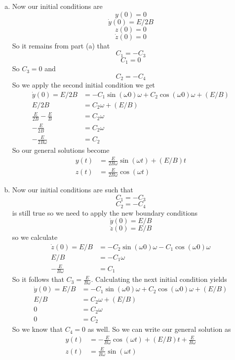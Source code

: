 \documentclass[11pt]{article}
\numberwithin{equation}{section}
\begin{document}
\begin{enumerate}[(a)]
\item
Now our initial conditions are
$$y(0) = 0$$
$$\dot{y}(0) = E/2B$$
$$z(0) = 0$$
$$\dot{z}(0) = 0$$
So it remains from part (a) that
$$C_1 = -C_3$$
$$C_1 = 0$$
So $C_3=0$ 
and 
$$C_2 = -C_4$$
So we apply the second initial condition we get
\begin{align*}
\dot{y}(0) = E/2B &= -C_1\sin(\omega 0)\omega + C_2\cos(\omega 0)\omega+(E/B)\\
E/2B &= C_2\omega+(E/B)\\
\frac{E}{2B}-\frac{E}{B} &= C_2\omega\\
-\frac{E}{2B} &= C_2\omega\\
-\frac{E}{2B\omega} &= C_2
\end{align*}
So our general solutions become
\begin{align*}
y(t) &= \frac{E}{2B\omega}\sin(\omega t)+(E/B)t\\
z(t) &= \frac{E}{2B\omega}\cos(\omega t)
\end{align*}

\item
Now our initial conditions are such that 
$$C_1=-C_3$$
$$C_2=-C_4$$
is still true so we need to apply the new boundary conditions
$$\dot{y}(0) = E/B$$
$$\dot{z}(0) = E/B$$
so we calculate 
\begin{align*}
\dot{z}(0) = E/B &= -C_2\sin(\omega 0)\omega-C_1\cos(\omega 0)\omega\\
E/B &= -C_1\omega\\
-\frac{E}{B\omega} &= C_1
\end{align*}
So it follows that $C_3 = \frac{E}{B\omega}$. Calculating the next initial condition yields
\begin{align*}
\dot{y}(0) = E/B &= -C_1\sin(\omega 0)\omega + C_2\cos(\omega 0)\omega+(E/B)\\
E/B &= C_2\omega+(E/B)\\
0 &= C_2\omega\\
0 &= C_2
\end{align*}
So we know that $C_4=0$ as well. So we can write our general solution as
\begin{align*}
y(t) &= -\frac{E}{B\omega}\cos(\omega t)+(E/B)t+\frac{E}{B\omega}\\
z(t) &= \frac{E}{B\omega}\sin(\omega t)
\end{align*}

\end{enumerate}
\end{document}

